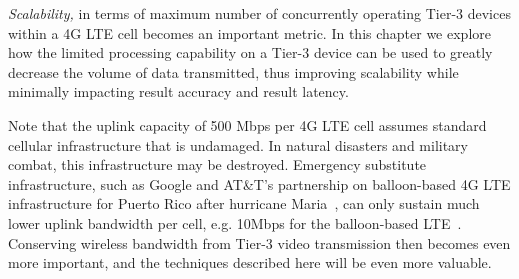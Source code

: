 {\em Scalability,} in terms of maximum number of concurrently operating Tier-3
devices within a 4G LTE cell becomes an important metric.  In this chapter we
explore how the limited processing capability on a Tier-3 device can be used to
greatly decrease the volume of data transmitted, thus improving scalability
while minimally impacting result accuracy and result latency.

Note that the uplink capacity of 500 Mbps per 4G LTE cell assumes standard
cellular infrastructure that is undamaged.  In natural disasters and military
combat, this infrastructure may be destroyed. Emergency substitute
infrastructure, such as Google and AT\&T's partnership on balloon-based 4G LTE
infrastructure for Puerto Rico after hurricane Maria~\cite{Morse2017}, can only
sustain much lower uplink bandwidth per cell, e.g. 10Mbps for the balloon-based
LTE~\cite{Sankaran2018}.  Conserving wireless bandwidth from Tier-3 video
transmission then becomes even more important, and the techniques described here
will be even more valuable.

